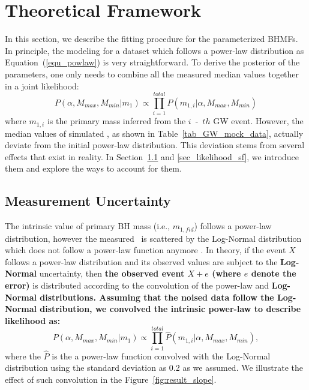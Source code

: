 \documentclass[twocolumn]{aastex62}
\begin{document}
\section{Theoretical Framework}  \label{sec_theory}
In this section, we describe the fitting procedure for the parameterized BHMFs. 
In principle, the modeling for a dataset which follows a power-law distribution as Equation~(\ref{equ_powlaw}) is very straightforward. To derive the posterior of the parameters, one only needs to combine all the measured median values together in a joint likelihood:
 \begin{equation} \label{equ_lik_powlaw}
 P(\alpha, M_{max}, M_{min}|m_{1}) \propto  \prod_{i=1}^{total} P(m_{1,i}|\alpha, M_{max}, M_{min})
 \end{equation}
 where $m_{1,i}$ is the primary mass inferred from the $i$~-~$th$ GW event.
However, the median values of simulated \mone, as shown in Table~\ref{tab_GW_mock_data}, actually deviate from the initial power-law distribution. This deviation stems from several effects that exist in reality. In Section~\ref{sec_likelihood_noise} and \ref{sec_likelihood_sf}, we introduce them and explore the ways to account for them.

\subsection{Measurement Uncertainty}\label{sec_likelihood_noise}
The intrinsic value of primary BH mass (i.e., $m_{1,fid}$) follows a power-law distribution, however the measured  \mone\ is scattered by the Log-Normal distribution which does not follow a power-law function anymore \citep{Koen2009}. In theory, if the event $X$ follows a power-law distribution and its observed values are subject to the {\bf Log-Normal} uncertainty, then {\bf the observed event $X + e$ (where $e$ denote the error)} is distributed according to the convolution of the power-law and {\bf Log-Normal distributions. Assuming that the noised data follow the Log-Normal distribution, we convolved the intrinsic power-law to describe likelihood as:}
 \begin{equation} \label{equ_lik_conv}
 P(\alpha, M_{max}, M_{min}|m_{1}) \propto  \prod_{i=1}^{total} \hat{P}(m_{1,i}|\alpha, M_{max}, M_{min}),
 \end{equation}
where the $\hat{P}$ is the a power-law function convolved with the Log-Normal distribution using the standard deviation as 0.2 as we assumed. We illustrate the effect of such convolution in the Figure~\ref{fig:result_slope}.
\end{document}
